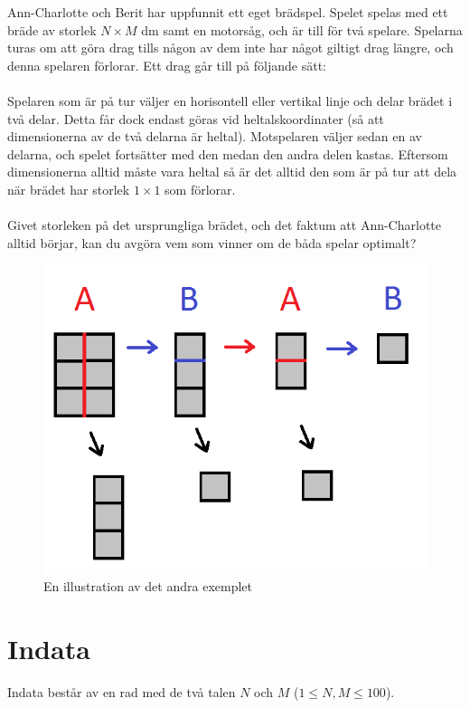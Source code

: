 
Ann-Charlotte och Berit har uppfunnit ett eget brädspel. Spelet spelas med ett bräde av storlek $N \times M$ dm samt en motorsåg, och är till för två spelare. Spelarna turas om att göra drag tills någon av dem inte har något giltigt drag längre, och denna spelaren förlorar. Ett drag går till på följande sätt:
\\\\
Spelaren som är på tur väljer en horisontell eller vertikal linje och delar brädet i två delar. Detta får dock endast göras vid heltalskoordinater (så att dimensionerna av de två delarna är heltal). Motspelaren väljer sedan en av delarna, och spelet fortsätter med den medan den andra delen kastas. Eftersom dimensionerna alltid måste vara heltal så är det alltid den som är på tur att dela när brädet har storlek $1 \times 1$ som förlorar.
\\\\
Givet storleken på det ursprungliga brädet, och det faktum att Ann-Charlotte alltid börjar, kan du avgöra vem som vinner om de båda spelar optimalt?

\begin{figure}[ht!]
\centering
\includegraphics[width=\textwidth]{bradspelet.png}
\caption{En illustration av det andra exemplet}
\label{overflow}
\end{figure}

\section*{Indata}
Indata består av en rad med de två talen $N$ och $M$ ($1 \le N,M \le 100$).

